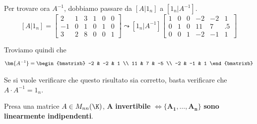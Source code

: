 \documentclass[11pt, a4paper, titlepage, oneside]{scrbook}
\begin{document}
Per trovare ora $A^{-1}$, dobbiamo passare da $[A|1_n]$ a $[1_n|A^{-1}]$.
\[[A|1_n] = \left[\begin{array}{ccc|ccc}
    2 & 1 & 3 & 1 & 0 & 0 \\
    -1 & 0 & 1 & 0 & 1 & 0 \\
    3 & 2 & 8 & 0 & 0 & 1
\end{array}\right]\leadsto [1_n | A^{-1}]
\left[ \begin{array}{ccc|ccc}
    1 & 0 & 0 & -2 & -2 & 1 \\
    0 & 1 & 0 & 11 & 7 & .5 \\
    0 & 0 & 1 & -2 & -1 & 1
\end{array}\right]
\]

Troviamo quindi che
\[
\bm{A^{-1}} = \begin{bmatrixb}
    -2 & -2 & 1 \\
    11 & 7 & -5 \\
    -2 & -1 & 1
\end{bmatrixb}
\]

\NB Se si vuole verificare che questo risultato sia corretto, basta verificare che $A \cdot A^{-1} = 1_n$.

\begin{Osservazione}[]
\label{oss-inversa}
Presa una matrice $A \in M_{nn}(\K)$, 
$\bm{A}$ \textbf{invertibile} $\iff \bm{\{A_1, \ldots, A_n\}}$ \textbf{sono linearmente indipendenti}.
\end{Osservazione}

\vspace{2cm}

\Dimostrazione \nopagebreak
\end{document}

